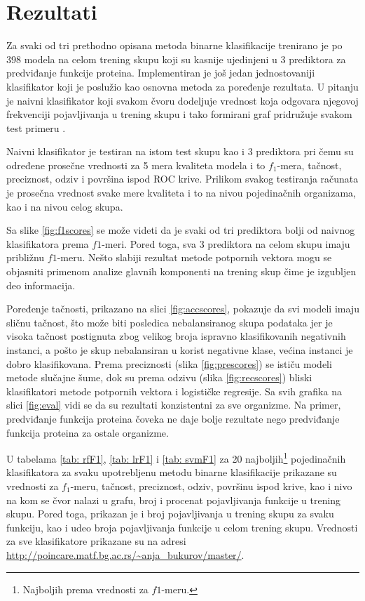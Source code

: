 \chapter{Rezultati} %
\label{Chapter6}

Za svaki od tri prethodno opisana metoda binarne klasifikacije trenirano je po 398 modela na celom trening skupu koji su kasnije ujedinjeni u 3 prediktora za predviđanje funkcije proteina. Implementiran je još jedan jednostovaniji klasifikator koji je poslužio kao osnovna metoda za poređenje rezultata. U pitanju je naivni klasifikator koji svakom čvoru dodeljuje vrednost koja odgovara njegovoj frekvenciji pojavljivanja u trening skupu i tako formirani graf pridružuje svakom test primeru \cite{doktJK}. 

Naivni klasifikator je testiran na istom test skupu kao i 3 prediktora pri čemu su određene prosečne vrednosti za 5 mera kvaliteta modela i to $f_1$-mera, tačnost, preciznost, odziv i površina ispod ROC krive. Prilikom svakog testiranja računata je prosečna vrednost svake mere kvaliteta i to na nivou pojedinačnih organizama, kao i na nivou celog skupa. 

Sa slike \ref{fig:f1scores} se može videti da je svaki od tri prediktora bolji od naivnog klasifikatora prema $f1$-meri. Pored toga, sva 3 prediktora na celom skupu imaju približnu $f1$-meru. Nešto slabiji rezultat metode potpornih vektora mogu se objasniti primenom analize glavnih komponenti na trening skup čime je izgubljen deo informacija. 


Poređenje tačnosti, prikazano na slici \ref{fig:accscores}, pokazuje da svi modeli imaju sličnu tačnost, što može biti posledica nebalansiranog skupa podataka jer je visoka tačnost postignuta zbog velikog broja ispravno klasifikovanih negativnih instanci, a pošto je skup nebalansiran u korist negativne klase, većina instanci je dobro klasifikovana. Prema preciznosti (slika \ref{fig:prescores}) se ističu modeli metode slučajne šume, dok su prema odzivu (slika \ref{fig:recscores}) bliski klasifikatori metode potpornih vektora i logističke regresije. Sa svih grafika na slici \ref{fig:eval} vidi se da su rezultati konzistentni za sve organizme. Na primer, predviđanje funkcija proteina čoveka ne daje bolje rezultate nego predviđanje funkcija proteina za ostale organizme.


U tabelama \ref{tab: rfF1}, \ref{tab: lrF1} i \ref{tab: svmF1} za 20 najboljih\footnote{Najboljih prema vrednosti za $f1$-meru.} pojedinačnih klasifikatora za svaku upotrebljenu metodu binarne klasifikacije prikazane su vrednosti za $f_1$-meru, tačnost, preciznost, odziv, površinu ispod krive, kao i nivo na kom se čvor nalazi u grafu, broj i procenat pojavljivanja funkcije u trening skupu. Pored toga, prikazan je i broj pojavljivanja u trening skupu za svaku funkciju, kao i udeo broja pojavljivanja funkcije u celom trening skupu. Vrednosti za sve klasifikatore prikazane su na adresi \url{http://poincare.matf.bg.ac.rs/~anja_bukurov/master/}.


